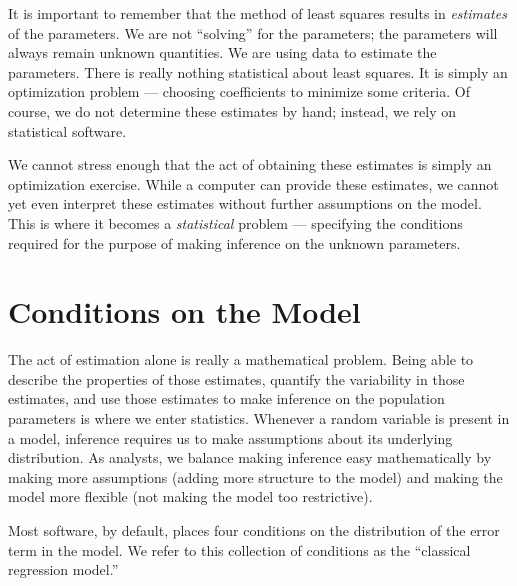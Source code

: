 \documentclass[
]{book}
\theoremstyle{plain}
\theoremstyle{mydefn}
\theoremstyle{myexmpl}
\theoremstyle{remark}
\begin{document}
It is important to remember that the method of least squares results in \emph{estimates} of the parameters. We are not ``solving'' for the parameters; the parameters will always remain unknown quantities. We are using data to estimate the parameters. There is really nothing statistical about least squares. It is simply an optimization problem --- choosing coefficients to minimize some criteria. Of course, we do not determine these estimates by hand; instead, we rely on statistical software.

We cannot stress enough that the act of obtaining these estimates is simply an optimization exercise. While a computer can provide these estimates, we cannot yet even interpret these estimates without further assumptions on the model. This is where it becomes a \emph{statistical} problem --- specifying the conditions required for the purpose of making inference on the unknown parameters.

\hypertarget{conditions-on-the-model}{%
\section{Conditions on the Model}\label{conditions-on-the-model}}

The act of estimation alone is really a mathematical problem. Being able to describe the properties of those estimates, quantify the variability in those estimates, and use those estimates to make inference on the population parameters is where we enter statistics. Whenever a random variable is present in a model, inference requires us to make assumptions about its underlying distribution. As analysts, we balance making inference easy mathematically by making more assumptions (adding more structure to the model) and making the model more flexible (not making the model too restrictive).

Most software, by default, places four conditions on the distribution of the error term in the model. We refer to this collection of conditions as the ``classical regression model.''
\end{document}
